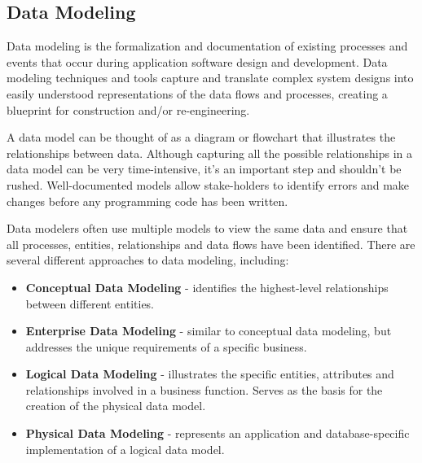 \documentclass[a4paper,12pt]{article}
\begin{document}
  \subsection*{Data Modeling }
Data modeling is the formalization and documentation of existing processes and events that occur during application software design and development. Data modeling techniques and tools capture and translate complex system designs into easily understood representations of the data flows and processes, creating a blueprint for construction and/or re-engineering.

A data model can be thought of as a diagram or flowchart that illustrates the relationships between data. Although capturing all the possible relationships in a data model can be very time-intensive, it's an important step and shouldn't be rushed. Well-documented models allow stake-holders to identify errors and make changes before any programming code has been written.

Data modelers often use multiple models to view the same data and ensure that all processes, entities, relationships and data flows have been identified. There are several different approaches to data modeling, including:
\begin{itemize}
\item  \textbf{Conceptual Data Modeling} - identifies the highest-level relationships between different entities.

\item  \textbf{Enterprise Data Modeling} - similar to conceptual data modeling, but addresses the unique requirements of a specific business. 

\item  \textbf{Logical Data Modeling} - illustrates the specific entities, attributes and relationships involved in a business function. Serves as the basis for the creation of the physical data model.

\item  \textbf{Physical Data Modeling} - represents an application and database-specific implementation of a logical data model.
    \end{itemize}

\end{document}
